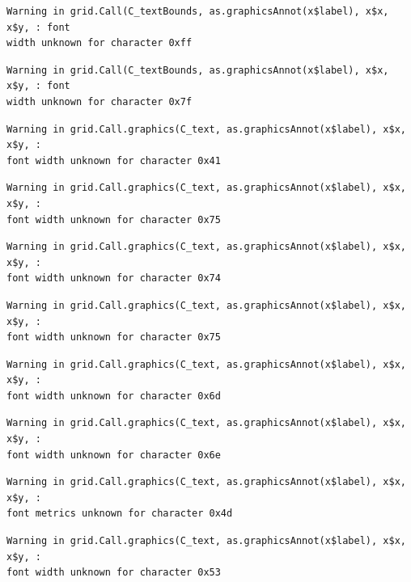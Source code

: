 \documentclass[
  letterpaper,
]{scrbook}
\begin{document}
\begin{verbatim}
Warning in grid.Call(C_textBounds, as.graphicsAnnot(x$label), x$x, x$y, : font
width unknown for character 0xff
\end{verbatim}

\begin{verbatim}
Warning in grid.Call(C_textBounds, as.graphicsAnnot(x$label), x$x, x$y, : font
width unknown for character 0x7f
\end{verbatim}

\begin{verbatim}
Warning in grid.Call.graphics(C_text, as.graphicsAnnot(x$label), x$x, x$y, :
font width unknown for character 0x41
\end{verbatim}

\begin{verbatim}
Warning in grid.Call.graphics(C_text, as.graphicsAnnot(x$label), x$x, x$y, :
font width unknown for character 0x75
\end{verbatim}

\begin{verbatim}
Warning in grid.Call.graphics(C_text, as.graphicsAnnot(x$label), x$x, x$y, :
font width unknown for character 0x74
\end{verbatim}

\begin{verbatim}
Warning in grid.Call.graphics(C_text, as.graphicsAnnot(x$label), x$x, x$y, :
font width unknown for character 0x75
\end{verbatim}

\begin{verbatim}
Warning in grid.Call.graphics(C_text, as.graphicsAnnot(x$label), x$x, x$y, :
font width unknown for character 0x6d
\end{verbatim}

\begin{verbatim}
Warning in grid.Call.graphics(C_text, as.graphicsAnnot(x$label), x$x, x$y, :
font width unknown for character 0x6e
\end{verbatim}

\begin{verbatim}
Warning in grid.Call.graphics(C_text, as.graphicsAnnot(x$label), x$x, x$y, :
font metrics unknown for character 0x4d
\end{verbatim}

\begin{verbatim}
Warning in grid.Call.graphics(C_text, as.graphicsAnnot(x$label), x$x, x$y, :
font width unknown for character 0x53
\end{verbatim}
\end{document}
